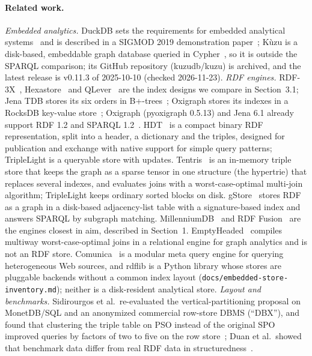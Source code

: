 \documentclass[sigconf, nonacm]{acmart}
\begin{document}
\paragraph{Related work.} \emph{Embedded analytics.} DuckDB sets the requirements for embedded analytical systems~\cite{raasveldt2020} and is described in a SIGMOD 2019 demonstration paper~\cite{raasveldt2019}; Kùzu is a disk-based, embeddable graph database queried in Cypher~\cite{feng2023}, so it is outside the SPARQL comparison; its GitHub repository (kuzudb/kuzu) is archived, and the latest release is v0.11.3 of 2025-10-10 (checked 2026-11-23).
\emph{RDF engines.} RDF-3X~\cite{neumann2008}, Hexastore~\cite{weiss2008} and QLever~\cite{bast2017} are the index designs we compare in Section~3.1; Jena TDB stores its six orders in B+-trees~\cite{arroyuelo2021}; Oxigraph stores its indexes in a RocksDB key-value store~\cite{oxigraphwiki}; Oxigraph (pyoxigraph 0.5.13) and Jena 6.1 already support RDF 1.2 and SPARQL 1.2~\cite{oxigraphrdf12,jenarelease}. HDT~\cite{fernandez2013} is a compact binary RDF representation, split into a header, a dictionary and the triples, designed for publication and exchange with native support for simple query patterns; TripleLight is a queryable store with updates. Tentris~\cite{bigerl2020} is an in-memory triple store that keeps the graph as a sparse tensor in one structure (the hypertrie) that replaces several indexes, and evaluates joins with a worst-case-optimal multi-join algorithm; TripleLight keeps ordinary sorted blocks on disk. gStore~\cite{zou2011} stores RDF as a graph in a disk-based adjacency-list table with a signature-based index and answers SPARQL by subgraph matching. MillenniumDB~\cite{vrgoc2021} and RDF Fusion~\cite{schwarzinger2025} are the engines closest in aim, described in Section~1. EmptyHeaded~\cite{aberger2017} compiles multiway worst-case-optimal joins in a relational engine for graph analytics and is not an RDF store. Comunica~\cite{taelman2018} is a modular meta query engine for querying heterogeneous Web sources, and rdflib is a Python library whose stores are pluggable backends without a common index layout (\texttt{docs/embedded-store-inventory.md}); neither is a disk-resident analytical store.
\emph{Layout and benchmarks.} Sidirourgos et al.\ re-evaluated the vertical-partitioning proposal on MonetDB/SQL and an anonymized commercial row-store DBMS (``DBX''), and found that clustering the triple table on PSO instead of the original SPO improved queries by factors of two to five on the row store~\cite{sidirourgos2008};
Duan et al.\ showed that benchmark data differ from real RDF data in structuredness~\cite{duan2011}.
\end{document}
